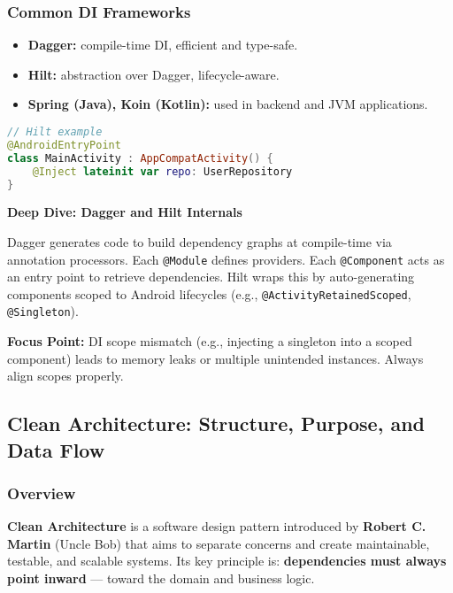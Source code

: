 \documentclass[a4paper,12pt]{article}
\begin{document}
\subsubsection{Common DI Frameworks}

\begin{itemize}
  \item \textbf{Dagger:} compile-time DI, efficient and type-safe.
  \item \textbf{Hilt:} abstraction over Dagger, lifecycle-aware.
  \item \textbf{Spring (Java), Koin (Kotlin):} used in backend and JVM applications.
\end{itemize}

\begin{lstlisting}[language=Kotlin]
// Hilt example
@AndroidEntryPoint
class MainActivity : AppCompatActivity() {
    @Inject lateinit var repo: UserRepository
}
\end{lstlisting}

\textbf{Deep Dive: Dagger and Hilt Internals}

Dagger generates code to build dependency graphs at compile-time via annotation processors. Each \texttt{@Module} defines providers. Each \texttt{@Component} acts as an entry point to retrieve dependencies. Hilt wraps this by auto-generating components scoped to Android lifecycles (e.g., \texttt{@ActivityRetainedScoped}, \texttt{@Singleton}).

\textbf{Focus Point:} DI scope mismatch (e.g., injecting a singleton into a scoped component) leads to memory leaks or multiple unintended instances. Always align scopes properly.

\subsection{Clean Architecture: Structure, Purpose, and Data Flow}

\subsubsection{Overview}

\textbf{Clean Architecture} is a software design pattern introduced by \textbf{Robert C. Martin} (Uncle Bob) that aims to separate concerns and create maintainable, testable, and scalable systems.  
Its key principle is: \textbf{dependencies must always point inward} — toward the domain and business logic.
\end{document}
